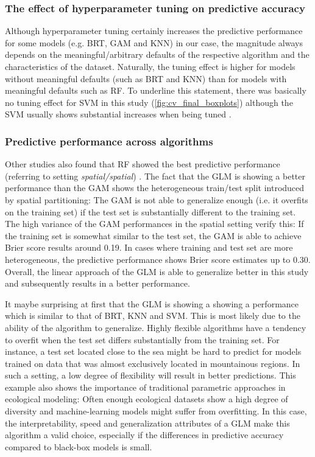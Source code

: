 \documentclass[review]{elsarticle}
\begin{document}
\subsubsection{The effect of hyperparameter tuning on predictive accuracy}
Although hyperparameter tuning certainly increases the predictive performance for some models (e.g. BRT, GAM and KNN) in our case, the magnitude always depends on the meaningful/arbitrary defaults of the respective algorithm and the characteristics of the dataset.
Naturally, the tuning effect is higher for models without meaningful defaults (such as BRT and KNN) than for models with meaningful defaults such as RF.
To underline this statement, there was basically no tuning effect for SVM in this study (\autoref{fig:cv_final_boxplots}) although the SVM usually shows substantial increases when being tuned \citep{Rojas_Dominguez2018}.

\subsubsection{Predictive performance across algorithms}
Other studies also found that RF showed the best predictive performance (referring to setting \emph{spatial/spatial}) \citep{Bahn2012, Jarnevich2017, Smolinski2016, Vorpahl2012}.
The fact that the GLM is showing a better performance than the GAM shows the heterogeneous train/test split introduced by spatial partitioning: The GAM is not able to generalize enough (i.e. it overfits on the training set) if the test set is substantially different to the training set.
The high variance of the GAM performances in the spatial setting verify this: If the training set is somewhat similar to the test set, the GAM is able to achieve Brier score results around 0.19.
In cases where training and test set are more heterogeneous, the predictive performance shows Brier score estimates up to 0.30.
Overall, the linear approach of the GLM is able to generalize better in this study and subsequently results in a better performance.

It maybe surprising at first that the GLM is showing a showing a performance which is similar to that of BRT, KNN and SVM.
This is most likely due to the ability of the algorithm to generalize.
Highly flexible algorithms have a tendency to overfit when the test set differs substantially from the training set.
For instance, a test set located close to the sea might be hard to predict for models trained on data that was almost exclusively located in mountainous regions.
In such a setting, a low degree of flexibility will result in better predictions.
This example also shows the importance of traditional parametric approaches in ecological modeling: Often enough ecological datasets show a high degree of diversity and machine-learning models might suffer from overfitting.
In this case, the interpretability, speed and generalization attributes of a GLM make this algorithm a valid choice, especially if the differences in predictive accuracy compared to black-box models is small.
\end{document}
